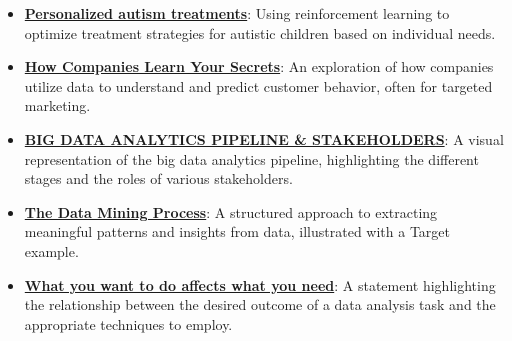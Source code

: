 \documentclass{article}%
\begin{document}
\begin{itemize}[leftmargin=*]
\item \href{https://purdue.brightspace.com/d2l/common/assets/pdfjs-d2l-dist/1.0.14-legacy/web/viewer.html?file=\%2Fcontent\%2Fenforced\%2F1095465-WL.202510.CS24200.LE1\%2F02L1-datas-intro.pdf\%3Fou\%3D1095465\&lang=en-us\&container=d2l-fileviewer-rendered-pdf\&fullscreen=d2l-fileviewer-rendered-pdf-dialog\&height=667#page=20}{\textbf{Personalized autism treatments}}: Using reinforcement learning to optimize treatment strategies for autistic children based on individual needs.%
\item \href{https://purdue.brightspace.com/d2l/common/assets/pdfjs-d2l-dist/1.0.14-legacy/web/viewer.html?file=\%2Fcontent\%2Fenforced\%2F1095465-WL.202510.CS24200.LE1\%2F02L1-datas-intro.pdf\%3Fou\%3D1095465\&lang=en-us\&container=d2l-fileviewer-rendered-pdf\&fullscreen=d2l-fileviewer-rendered-pdf-dialog\&height=667#page=21}{\textbf{How Companies Learn Your Secrets}}: An exploration of how companies utilize data to understand and predict customer behavior, often for targeted marketing.%
\item \href{https://purdue.brightspace.com/d2l/common/assets/pdfjs-d2l-dist/1.0.14-legacy/web/viewer.html?file=\%2Fcontent\%2Fenforced\%2F1095465-WL.202510.CS24200.LE1\%2F02L1-datas-intro.pdf\%3Fou\%3D1095465\&lang=en-us\&container=d2l-fileviewer-rendered-pdf\&fullscreen=d2l-fileviewer-rendered-pdf-dialog\&height=667#page=24}{\textbf{BIG DATA ANALYTICS PIPELINE \& STAKEHOLDERS}}: A visual representation of the big data analytics pipeline, highlighting the different stages and the roles of various stakeholders.%
\item \href{https://purdue.brightspace.com/d2l/common/assets/pdfjs-d2l-dist/1.0.14-legacy/web/viewer.html?file=\%2Fcontent\%2Fenforced\%2F1095465-WL.202510.CS24200.LE1\%2F02L1-datas-intro.pdf\%3Fou\%3D1095465\&lang=en-us\&container=d2l-fileviewer-rendered-pdf\&fullscreen=d2l-fileviewer-rendered-pdf-dialog\&height=667#page=25}{\textbf{The Data Mining Process}}: A structured approach to extracting meaningful patterns and insights from data, illustrated with a Target example.%
\item \href{https://purdue.brightspace.com/d2l/common/assets/pdfjs-d2l-dist/1.0.14-legacy/web/viewer.html?file=\%2Fcontent\%2Fenforced\%2F1095465-WL.202510.CS24200.LE1\%2F02L1-datas-intro.pdf\%3Fou\%3D1095465\&lang=en-us\&container=d2l-fileviewer-rendered-pdf\&fullscreen=d2l-fileviewer-rendered-pdf-dialog\&height=667#page=27}{\textbf{What you want to do affects what you need}}: A statement highlighting the relationship between the desired outcome of a data analysis task and the appropriate techniques to employ.%
\end{itemize}
\end{document}
